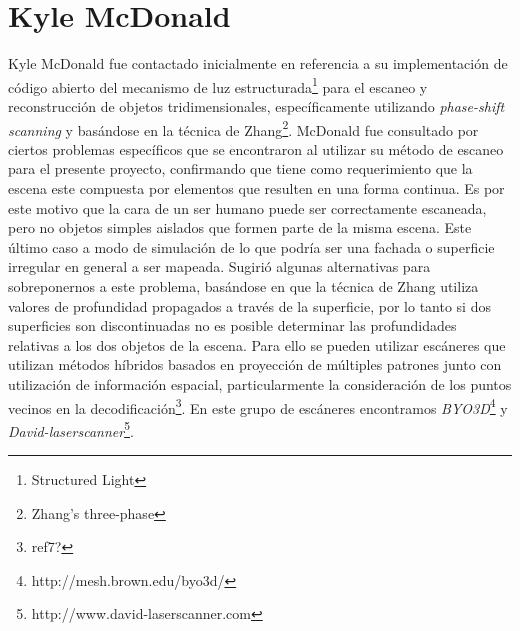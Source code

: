 \section{Kyle McDonald}%
Kyle McDonald\cite{KyleMcDonald} fue contactado inicialmente en referencia a su implementación de código abierto del mecanismo de luz estructurada\footnote{Structured Light} para el escaneo y reconstrucción de objetos tridimensionales, específicamente utilizando \emph{phase-shift scanning} y basándose en la técnica de Zhang\footnote{Zhang's three-phase}. McDonald fue consultado por ciertos problemas específicos %
que se encontraron al utilizar su método de escaneo para el presente proyecto, confirmando que tiene como requerimiento que la escena este compuesta por elementos que resulten en una forma continua. Es por este motivo que la cara de un ser humano puede ser correctamente escaneada, pero no objetos simples aislados que formen parte de la misma escena. Este último caso a modo de simulación de lo que podría ser una fachada o superficie irregular en general a ser mapeada. Sugirió algunas alternativas para sobreponernos a este problema, basándose en que la técnica de Zhang utiliza valores de profundidad propagados a través de la superficie, por lo tanto si dos superficies son discontinuadas no es posible determinar las profundidades relativas a los dos objetos de la escena. Para ello se pueden utilizar escáneres que utilizan métodos híbridos basados en proyección de múltiples patrones junto con utilización de información espacial, particularmente la consideración de los puntos vecinos en la decodificación\footnote{ref7?}. En este grupo de escáneres encontramos \emph{BYO3D}\footnote{http://mesh.brown.edu/byo3d/} y \emph{David-laserscanner}\footnote{http://www.david-laserscanner.com}.